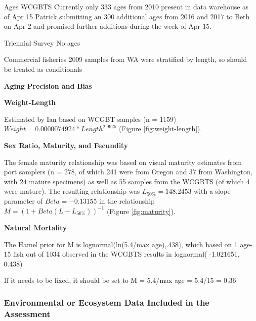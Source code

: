 \documentclass[12pt,]{article}
\begin{document}
Ages WCGBTS Currently only 333 ages from 2010 present in data warehouse
as of Apr 15 Patrick submitting an 300 additional ages from 2016 and
2017 to Beth on Apr 2 and promised further additions during the week of
Apr 15.

Triennial Survey No ages

Commercial fisheries 2009 samples from WA were stratified by length, so
should be treated as conditionals

\vspace{.5cm}

\textbf{Aging Precision and Bias}

\vspace{.5cm}

\textbf{Weight-Length}

Estimated by Ian based on WCGBT samples (n = 1159)
\(Weight = 0.0000074924 * Length ^ 2.9925\) (Figure
\ref{fig:weight-length}).

\vspace{.5cm}

\textbf{Sex Ratio, Maturity, and Fecundity}

The female maturity relationship was based on visual maturity estimates
from port samplers (n = 278, of which 241 were from Oregon and 37 from
Washington, with 24 mature specimens) as well as 55 samples from the
WCGBTS (of which 4 were mature). The resulting relationship was
\(L_{50\%} = 148.2453\) with a slope parameter of \(Beta = -0.13155\) in
the relationship \(M = (1 + Beta(L - L_{50\%}))^{-1}\) (Figure
\ref{fig:maturity}).

\vspace{.5cm}

\textbf{Natural Mortality}

The Hamel prior for M is lognormal(ln(5.4/max age),.438), which based on
1 age-15 fish out of 1034 observed in the WCGBTS results in lognormal(
-1.021651, 0.438)

If it needs to be fixed, it should be set to M = 5.4/max age = 5.4/15 =
0.36

\vspace{.5cm}

\hypertarget{environmental-or-ecosystem-data-included-in-the-assessment}{%
\subsubsection{Environmental or Ecosystem Data Included in the
Assessment}\label{environmental-or-ecosystem-data-included-in-the-assessment}}
\end{document}
